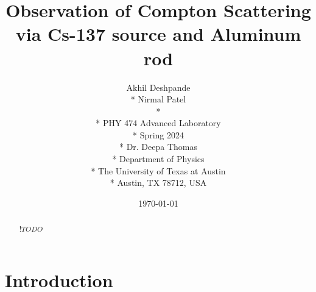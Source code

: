 \documentclass[10pt,letterpaper,onecolumn]{article}
\begin{document}
\title{Observation of Compton Scattering via Cs-137 source and Aluminum rod}
\author{
 Akhil Deshpande \\*
 Nirmal Patel \\*
 \\*
 PHY 474 Advanced Laboratory \\*
 Spring 2024 \\*
 Dr. Deepa Thomas \\*
 Department of Physics \\*
 The University of Texas at Austin \\*
 Austin, TX 78712, USA
}
\date{\today}
\maketitle
\begin{abstract}  
    $!TODO$  
\end{abstract}
\section{Introduction}
\end{document}
